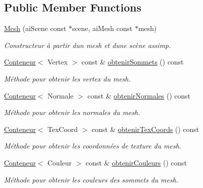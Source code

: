 \subsection*{Public Member Functions}
\begin{DoxyCompactItemize}
\item 
\hyperlink{classmodele_1_1_mesh_a37bac341d514cb2edf8c409d0ee5f7f8}{Mesh} (ai\+Scene const $\ast$scene, ai\+Mesh const $\ast$mesh)
\begin{DoxyCompactList}\small\item\em Constructeur à partir d\textquotesingle{}un mesh et d\textquotesingle{}une scène assimp. \end{DoxyCompactList}\item 
\hyperlink{classmodele_1_1_mesh_adbc8897d8cdca4541a2068c874aa54eb}{Conteneur}$<$ Vertex $>$ const \& \hyperlink{classmodele_1_1_mesh_acd81c408cf6963ff4605658cdc45b290}{obtenir\+Sommets} () const 
\begin{DoxyCompactList}\small\item\em Méthode pour obtenir les vertex du mesh. \end{DoxyCompactList}\item 
\hyperlink{classmodele_1_1_mesh_adbc8897d8cdca4541a2068c874aa54eb}{Conteneur}$<$ Normale $>$ const \& \hyperlink{classmodele_1_1_mesh_a88016a49bdd88d70afef9e590c7c4a11}{obtenir\+Normales} () const 
\begin{DoxyCompactList}\small\item\em Méthode pour obtenir les normales du mesh. \end{DoxyCompactList}\item 
\hyperlink{classmodele_1_1_mesh_adbc8897d8cdca4541a2068c874aa54eb}{Conteneur}$<$ Tex\+Coord $>$ const \& \hyperlink{classmodele_1_1_mesh_ac48a1ff182f6b68069b72eff692f8196}{obtenir\+Tex\+Coords} () const 
\begin{DoxyCompactList}\small\item\em Méthode pour obtenir les coordonnées de texture du mesh. \end{DoxyCompactList}\item 
\hyperlink{classmodele_1_1_mesh_adbc8897d8cdca4541a2068c874aa54eb}{Conteneur}$<$ Couleur $>$ const \& \hyperlink{classmodele_1_1_mesh_a4333bdb21580f548ef22bb3954b7c179}{obtenir\+Couleurs} () const 
\begin{DoxyCompactList}\small\item\em Méthode pour obtenir les couleurs des sommets du mesh. \end{DoxyCompactList}\item 

\end{DoxyCompactItemize}
